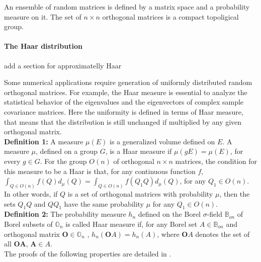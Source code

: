 \documentclass[a4paper]{article}
\begin{document}
An ensemble of random matrices is defined by a matrix space and a probability measure on it.
The set of $n \times n$ orthogonal matrices is a compact topoligical group.

\paragraph{The Haar distribution \\}

add a section for approximatelly Haar

Some numerical applications require generation of uniformly distributed random orthogonal matrices. For 
example, the Haar measure is essential to analyze the statistical behavior of the eigenvalues and the eigenvectors 
of complex sample covariance matrices. Here the uniformity is 
defined in terms of Haar measure, that means that the distribution is still unchanged if multiplied by any given orthogonal 
matrix.  \\

\textbf{Definition 1:}
A measure $\mu(E)$ is a generalized volume defined on $E$. A measure $\mu$,
defined on a group $G$, is a Haar measure if $\mu(gE) = \mu(E)$, for every $g \in G$.
For the group $O(n)$ of orthogonal $n \times n$ matrices, the condition for this
measure to be a Haar is that, for any continuous function $f$,\\

$\int_{Q \in O(n)} f(Q) d_\mu(Q) = \int_{Q \in O(n)} f(Q_1Q) d_\mu(Q)$, for any $Q_1 \in  O(n)$.\\

In other words, if $Q$ is a set of orthogonal matrices with probability
$\mu$, then the sets $Q_1Q$ and $Q Q_1$ have the same probability $\mu$ for any $Q_1 \in  O(n)$.\\



\textbf{Definition 2:}
The probability measure $h_n$ defined on the Borel $\sigma$-field $\mathbb{B}_{on}$ of Borel subsets of 
$\mathbb{O}_n$ is called Haar measure if, for any Borel set $A \in \mathbb{B}_{on}$ and orthogonal matrix 
$\textbf{O} \in \mathbb{O}_{n}$ , $h_n(\textbf{O} A) = h_n(A)$, where $\textbf{O} A$ denotes the set of all 
$\textbf{O} \textbf{A} $, $\textbf{A}  \in A$.\\

The proofs of the following properties are detailed in \cite[Chapter 10]{bai2009spectral}.\\
\end{document}
